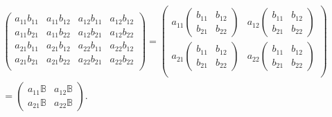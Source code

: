 \documentclass{math_library}
\begin{document}
\begin{align*}
\begin{pmatrix}
a_{11}b_{11} & a_{11}b_{12} & a_{12}b_{11} & a_{12}b_{12} \\
a_{11}b_{21} & a_{11}b_{22} & a_{12}b_{21} & a_{12}b_{22} \\
a_{21}b_{11} & a_{21}b_{12} & a_{22}b_{11} & a_{22}b_{12} \\
a_{21}b_{21} & a_{21}b_{22} & a_{22}b_{21} & a_{22}b_{22} \\
\end{pmatrix} = \begin{pmatrix}
a_{11} \begin{pmatrix}
b_{11} & b_{12} \\
b_{21} & b_{22}
\end{pmatrix} & a_{12} \begin{pmatrix}
b_{11} & b_{12} \\
b_{21} & b_{22}
\end{pmatrix} \\
a_{21} \begin{pmatrix}
b_{11} & b_{12} \\
b_{21} & b_{22}
\end{pmatrix} & a_{22} \begin{pmatrix}
b_{11} & b_{12} \\
b_{21} & b_{22}
\end{pmatrix} \\
\end{pmatrix} \\
= \begin{pmatrix}
a_{11} \mathbb{B} & a_{12} \mathbb{B} \\
a_{21} \mathbb{B} & a_{22} \mathbb{B} 
\end{pmatrix}.
\end{align*}
\end{document}
